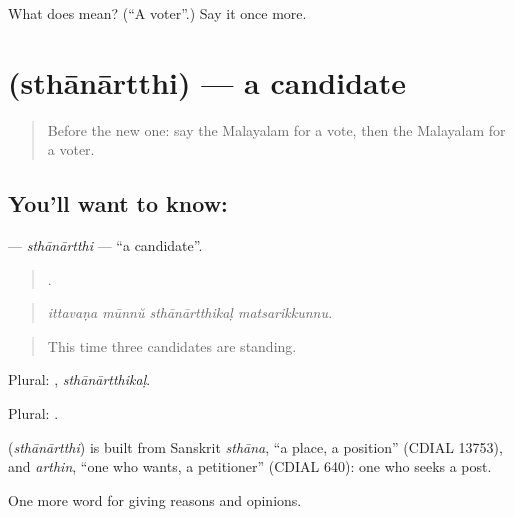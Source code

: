 \begin{tcolorbox}[breakable,colback=teal!4,colframe=teal!35!black,title={Before you move on}]
What does  mean? (\textquotedblleft{}A voter\textquotedblright{}.) Say it once more.
\end{tcolorbox}
\section[\texorpdfstring{\ml{സ്ഥാനാർത്ഥി} (sthānārtthi)}{സ്ഥാനാർത്ഥി (sthānārtthi)}]{ (sthānārtthi) — a candidate}

\label{lesson:ML-C419-sthanartthi}



\begin{quote}
Before the new one: say the Malayalam for a vote, then the Malayalam for a voter.
\end{quote}

\subsection*{You'll want to know: }
\textbf{} — \emph{sthānārtthi} — \textquotedblleft{}a candidate\textquotedblright{}.

\begin{quote}
   .
\end{quote}

\begin{quote}
\emph{ittavaṇa mūnnŭ sthānārtthikaḷ matsarikkunnu.}
\end{quote}

\begin{quote}
This time three candidates are standing.
\end{quote}

Plural: , \emph{sthānārtthikaḷ}.

Plural: .

\begin{cousinweb}
\textbf{} (\emph{sthānārtthi}) is built from Sanskrit \emph{sthāna}, \textquotedblleft{}a place, a position\textquotedblright{} (CDIAL 13753), and \emph{arthin}, \textquotedblleft{}one who wants, a petitioner\textquotedblright{} (CDIAL 640): one who seeks a post.
\end{cousinweb}

\begin{grammarlens}[title={What you've built}]
One more word for giving reasons and opinions.
\end{grammarlens}

